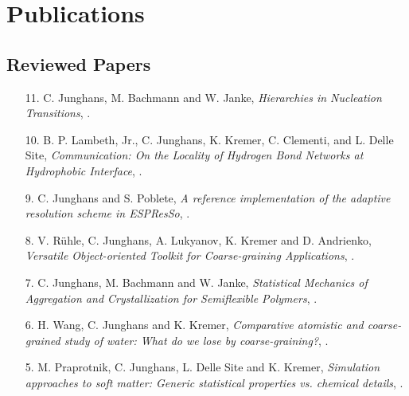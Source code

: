 \documentclass{article}
\begin{document}
\section*{Publications}

\subsection*{Reviewed Papers}

\begin{enumerate}
\item[11.] C. Junghans, M. Bachmann and W. Janke,
  \textit{Hierarchies in Nucleation Transitions},
  .

\item[10.] B. P. Lambeth, Jr., C. Junghans, K. Kremer, C. Clementi, and L. Delle Site, 
  \textit{Communication: On the Locality of Hydrogen Bond Networks at Hydrophobic Interface},
  .

\item[9.] C. Junghans and S. Poblete,
  \textit{A reference implementation of the adaptive resolution scheme in ESPResSo},
  .

\item[8.] V. R{\"u}hle, C. Junghans, A. Lukyanov, K. Kremer and D. Andrienko,
  \textit{Versatile Object-oriented Toolkit for Coarse-graining Applications},
  . 

\item[7.] C. Junghans, M. Bachmann and W. Janke,
  \textit{Statistical Mechanics of Aggregation and Crystallization for Semiflexible Polymers},
  .

\item[6.] H. Wang, C. Junghans and K. Kremer,
  \textit{Comparative atomistic and coarse-grained study of water: What do we lose by coarse-graining?},
  .

\item[5.] M. Praprotnik, C. Junghans, L. Delle Site and K. Kremer,
  \textit{Simulation approaches to soft matter: Generic statistical properties vs. chemical details},
  .


\end{enumerate}
\end{document}
